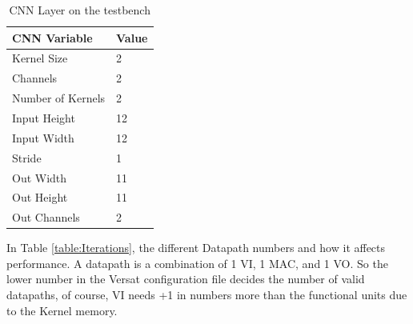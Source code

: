 \documentclass[conference]{IEEEtran}
\begin{document}
\begin{table}[!htpb]
    \centering
    \begin{tabular}{ll}
    \hline
    \textbf{CNN Variable} & \textbf{Value}        \\ \hline
    Kernel Size            & 2                 \\
    Channels            & 2                       \\
    Number of Kernels            & 2                       \\
    Input Height                  & 12                        \\
    Input Width                & 12                  \\
    Stride              & 1                     \\
    Out Width               & 11                      \\
    Out Height            & 11  \\
    Out Channels                   & 2                     \\ \hline
    \end{tabular}
    \label{table:convInput}
    \linebreak
    \caption{CNN Layer on the testbench}
\end{table}



In Table \ref{table:Iterations}, the different Datapath numbers and how it affects performance.
A datapath is a combination of 1 VI, 1 MAC, and 1 VO. So the lower number in the Versat configuration file
decides the number of valid datapaths, of course, VI needs +1 in numbers more than the functional units due to the Kernel memory.
\end{document}
